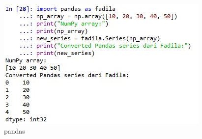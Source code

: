 \begin{enumerate}
\begin{itemize}
\begin{figure}[ht]
\centering
\includegraphics[scale=0.4]{figures/pandasfadila.jpg}
\caption{pandas}
\label{contoh}
\end{figure}
\par
\end{itemize}



\end{enumerate}
